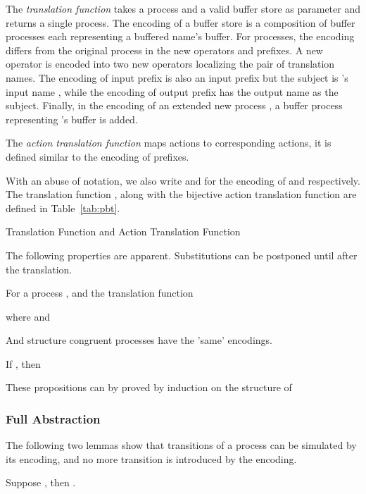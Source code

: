 \documentclass[runningheads, envcountsame, a4paper]{llncs}
\begin{document}
The \emph{translation function}  takes a  process and a valid buffer store as parameter
and returns a single  process.
The encoding of a buffer store is a composition of buffer processes each representing a buffered name's buffer.
For processes, the encoding differs from the original process in the new operators and prefixes.
A new operator is encoded into two new operators localizing the pair of translation names.
The encoding of input prefix  is also an input prefix
but the subject is 's input name ,
while the encoding of output prefix  has the output name  as the subject.
Finally, in the encoding of an extended new process , a buffer process representing 's buffer is added.

The \emph{action translation function}  maps  actions to corresponding  actions,
it is defined similar to the encoding of prefixes.

With an abuse of notation, we also write  and  for the encoding of  and  respectively.
The translation function , along with the bijective action translation function  are defined in Table~\ref{tab:pbt}.

\begin{table}
  
  \caption{ Translation Function  and Action Translation Function }
  \label{tab:pbt}
\end{table}

The following properties are apparent.
Substitutions can be postponed until after the translation.
\begin{proposition}
  For a process , and the translation function 
  
  where  and 
  \label{lem:subs}
\end{proposition}

And structure congruent processes have the 'same' encodings.
\begin{proposition}
  If , then 
  \label{lem:sctrans}
\end{proposition}

These propositions can by proved by induction on the structure of 


\subsubsection{Full Abstraction}

The following two lemmas show that transitions of a  process can be simulated by its encoding,
and no more transition is introduced by the encoding.

\begin{lemma}
  Suppose , then .
  \label{lem:gosim1}
\end{lemma}
\end{document}

